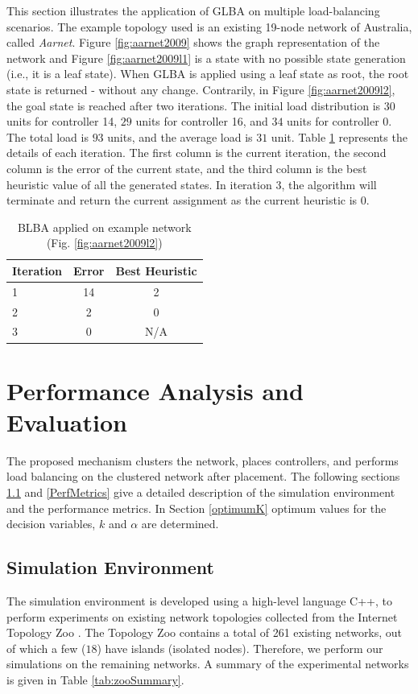 \documentclass[a4paper,fleqn]{cas-dc}
\begin{document}
\noindent This section illustrates the application of GLBA on multiple load-balancing scenarios. The example topology used is an existing 19-node network of Australia, called \textit{Aarnet}. Figure \ref{fig:aarnet2009} shows the graph representation of the network and Figure \ref{fig:aarnet2009l1} is a state with no possible state generation (i.e., it is a leaf state). When GLBA is applied using a leaf state as root, the root state is returned - without any change. Contrarily, in Figure \ref{fig:aarnet2009l2}, the goal state is reached after two iterations. The initial load distribution is $30$ units for controller 14, $29$ units for controller 16, and $34$ units for controller 0. The total load is $93$ units, and the average load is $31$ unit. Table \ref{tab:example} represents the details of each iteration. The first column is the current iteration, the second column is the error of the current state, and the third column is the best heuristic value of all the generated states. In iteration 3, the algorithm will terminate and return the current assignment as the current heuristic is $0$.
	
\begin{table}
	\centering
	\caption{BLBA applied on example network (Fig. \ref{fig:aarnet2009l2})} \label{tab:example}
	\begin{tabular}{|l|c|c|}
		\hline
		\textbf{Iteration} & \textbf{Error} & \textbf{Best Heuristic} \\
		\hline
		1 & 14 & 2 \\
		\hline
		2 & 2 & 0 \\
		\hline
		3 & 0 & N/A \\
		\hline
	\end{tabular}
\end{table}

\section{Performance Analysis and Evaluation} \label{simulations}

\noindent The proposed mechanism clusters the network, places controllers, and performs load balancing on the clustered network after placement. The following sections \ref{SimEnv} and \ref{PerfMetrics} give a detailed description of the simulation environment and the performance metrics. In Section \ref{optimumK} optimum values for the decision variables, $k$ and $\alpha$ are determined.

\subsection{Simulation Environment} \label{SimEnv}
\noindent The simulation environment is developed using a high-level language C++, to perform experiments on existing network topologies collected from the Internet Topology Zoo \cite{knight2011internet}. The Topology Zoo contains a total of 261 existing networks, out of which a few ($18$) have islands (isolated nodes). Therefore, we perform our simulations on the remaining networks. A summary of the experimental networks is given in Table \ref{tab:zooSummary}.
\end{document}
